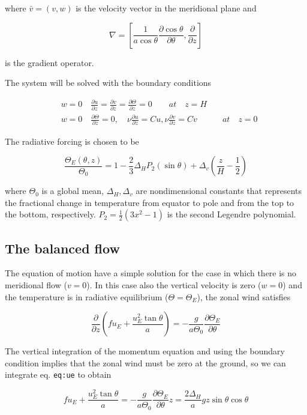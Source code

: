 where \(\bar{v}= (v,w)\) is the velocity vector in the meridional plane
and

\[\nabla =\left[ \frac{1}{a \cos\theta}\frac{\partial \cos\theta}{\partial \theta}, \frac{\partial }{\partial z}\right]\]

is the gradient operator.

The system will be solved with the boundary conditions

\[\begin{aligned}
&w =0 \quad \frac{\partial u}{\partial z}=\frac{\partial v}{\partial z}=\frac{\partial \Theta}{\partial z}=0 \qquad at \quad z=H \\
&w=0 \quad \frac{\partial \Theta}{\partial z} = 0 , \quad \nu\frac{\partial u}{\partial z} = C u,  \nu\frac{\partial v}{\partial z} = C v \quad \qquad at \quad z=0
\end{aligned}\]

The radiative forcing is chosen to be

\[\frac{\Theta_E(\theta,z)}{\Theta_0} = 1 -\frac{2}{3}\Delta_H P_2(\sin\theta) + \Delta_v\left( \frac{z}{H} - \frac{1}{2}\right)\]

where \(\Theta_0\) is a global mean, \(\Delta_H, \Delta_v\) are
nondimensional constants that represents the fractional change in
temperature from equator to pole and from the top to the bottom,
respectively. \(P_2 = \frac{1}{2}(3x^2-1)\) is the second Legendre
polynomial.

\subsection{The balanced flow}\label{the-balanced-flow}

The equation of motion have a simple solution for the case in which
there is no meridional flow (\(v=0\)). In this case also the vertical
velocity is zero (\(w=0\)) and the temperature is in radiative
equilibrium (\(\Theta = \Theta_E\)), the zonal wind satisfies

{\[\frac{\partial }{\partial z}\left(f u_E + \frac{u_E^2 \tan\theta}{a}\right) = -\frac{g}{a\Theta_0}\frac{\partial \Theta_E}{\partial \theta}\]}

The vertical integration of the momentum equation and using the boundary
condition implies that the zonal wind must be zero at the ground, so we
can integrate eq. \texttt{eq:ue} to obtain

{\[f u_E + \frac{u_E^2 \tan\theta}{a} = -\frac{g}{a\Theta_0}\frac{\partial \Theta_E}{\partial \theta} z = \frac{2\Delta_H}{a} g z \sin\theta \cos\theta\]}

